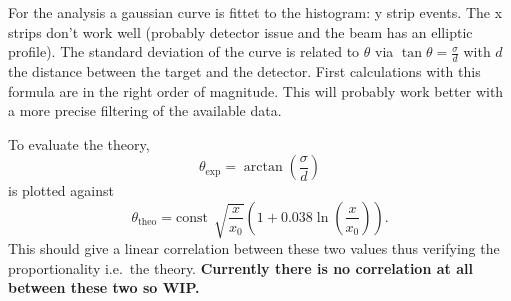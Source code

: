 \documentclass[sn-mathphys-num,iicol]{sn-jnl}
\theoremstyle{thmstyleone}
\theoremstyle{thmstyletwo}
\theoremstyle{thmstylethree}
\begin{document}
For the analysis a gaussian curve is fittet to the histogram: y strip events.
The x strips don't work well (probably detector issue and the beam has an elliptic profile).
The standard deviation of the curve is related to $\theta $ via $\tan \theta =\tfrac{\sigma }{d}$ with $d$ the distance between the target and the detector.
First calculations with this formula are in the right order of magnitude.
This will probably work better with a more precise filtering of the available data.

To evaluate the theory, $$\theta _\text{exp}=\arctan\left(\dfrac{\sigma }{d}\right)$$ is plotted against $$\theta _\text{theo}=\text{const}\,\sqrt[]{\dfrac{x}{x_0}}\left(1+0.038\ln\left(\dfrac{x}{x_0}\right)\right).$$
This should give a linear correlation between these two values thus verifying the proportionality i.e.\ the theory.
\textbf{Currently there is no correlation at all between these two so WIP.}

%
\end{document}
